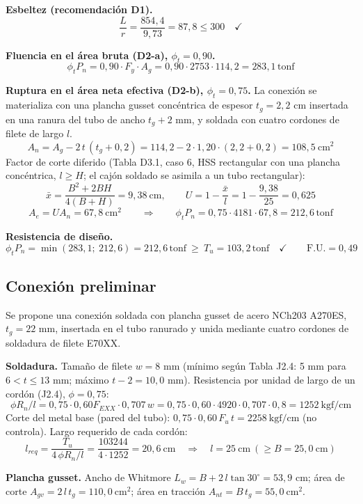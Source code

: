 \documentclass[11pt,letterpaper]{article}
\newcommand{\tonf}{\,\mathrm{tonf}}
\begin{document}
\textbf{Esbeltez (recomendación D1).}
\[
\frac{L}{r} = \frac{854{,}4}{9{,}73} = 87{,}8 \le 300 \quad \checkmark
\]

\textbf{Fluencia en el área bruta (D2-a), $\phi_t = 0{,}90$.}
\[
\phi_t P_n = 0{,}90 \cdot F_y \cdot A_g = 0{,}90 \cdot 2753 \cdot 114{,}2
= 283{,}1\tonf
\]

\textbf{Ruptura en el área neta efectiva (D2-b), $\phi_t = 0{,}75$.}
La conexión se materializa con una plancha gusset concéntrica de espesor $t_g = 2{,}2$ cm insertada en
una ranura del tubo de ancho $t_g + 2$ mm, y soldada con cuatro cordones de filete de largo $l$.
\[
A_n = A_g - 2\,t\,(t_g + 0{,}2) = 114{,}2 - 2\cdot1{,}20\cdot(2{,}2+0{,}2)
= 108{,}5\ \mathrm{cm^2}
\]
Factor de corte diferido (Tabla D3.1, caso 6, HSS rectangular con una plancha concéntrica, $l \ge H$; el cajón soldado se asimila a un tubo rectangular):
\[
\bar{x} = \frac{B^2 + 2BH}{4(B+H)} = 9{,}38\ \mathrm{cm},
\qquad
U = 1 - \frac{\bar{x}}{l} = 1 - \frac{9{,}38}{25} = 0{,}625
\]
\[
A_e = U A_n = 67{,}8\ \mathrm{cm^2}
\qquad\Rightarrow\qquad
\phi_t P_n = 0{,}75 \cdot 4181 \cdot 67{,}8 = 212{,}6\tonf
\]

\textbf{Resistencia de diseño.}
\[
\phi_t P_n = \min(283{,}1;\ 212{,}6) = 212{,}6\tonf
\ \ge\ T_u = 103{,}2\tonf \quad \checkmark
\qquad \text{F.U.} = 0{,}49
\]

\subsection{Conexión preliminar}
Se propone una conexión soldada con plancha gusset de acero NCh203 A270ES, $t_g = 22$ mm, insertada
en el tubo ranurado y unida mediante cuatro cordones de soldadura de filete E70XX.

\textbf{Soldadura.} Tamaño de filete $w = 8$ mm (mínimo según Tabla J2.4: 5 mm para
$6 < t \le 13$ mm; máximo $t - 2 = 10{,}0$ mm).
Resistencia por unidad de largo de un cordón (J2.4), $\phi = 0{,}75$:
\[
\phi R_n/l = 0{,}75 \cdot 0{,}60 F_{EXX} \cdot 0{,}707\,w
= 0{,}75 \cdot 0{,}60 \cdot 4920 \cdot 0{,}707 \cdot 0{,}8
= 1252\ \mathrm{kgf/cm}
\]
Corte del metal base (pared del tubo): $0{,}75\cdot 0{,}60\,F_u\,t = 2258\ \mathrm{kgf/cm}$ (no controla).
Largo requerido de cada cordón:
\[
l_{req} = \frac{T_u}{4\,\phi R_n/l} = \frac{103244}{4 \cdot 1252}
= 20{,}6\ \mathrm{cm}
\quad\Rightarrow\quad l = 25\ \mathrm{cm} \ (\ge B = 25{,}0\ \mathrm{cm})
\]

\textbf{Plancha gusset.} Ancho de Whitmore $L_w = B + 2\,l\tan 30^\circ = 53{,}9$ cm;
área de corte $A_{gv} = 2\,l\,t_g = 110{,}0\ \mathrm{cm^2}$; área en tracción $A_{nt} = B\,t_g = 55{,}0\ \mathrm{cm^2}$.
\end{document}
